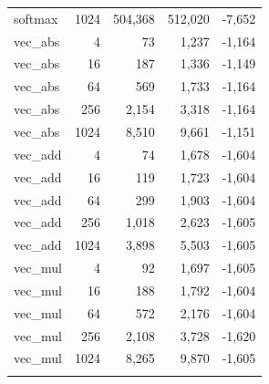 \begin{center}
\begin{longtable}{l r r r r}
softmax & 1024 & 504,368 & 512,020 & -7,652 \\ 
vec_abs & 4 & 73 & 1,237 & -1,164 \\ 
vec_abs & 16 & 187 & 1,336 & -1,149 \\ 
vec_abs & 64 & 569 & 1,733 & -1,164 \\ 
vec_abs & 256 & 2,154 & 3,318 & -1,164 \\ 
vec_abs & 1024 & 8,510 & 9,661 & -1,151 \\ 
vec_add & 4 & 74 & 1,678 & -1,604 \\ 
vec_add & 16 & 119 & 1,723 & -1,604 \\ 
vec_add & 64 & 299 & 1,903 & -1,604 \\ 
vec_add & 256 & 1,018 & 2,623 & -1,605 \\ 
vec_add & 1024 & 3,898 & 5,503 & -1,605 \\ 
vec_mul & 4 & 92 & 1,697 & -1,605 \\ 
vec_mul & 16 & 188 & 1,792 & -1,604 \\ 
vec_mul & 64 & 572 & 2,176 & -1,604 \\ 
vec_mul & 256 & 2,108 & 3,728 & -1,620 \\ 
vec_mul & 1024 & 8,265 & 9,870 & -1,605 \\ 
\hline\n\end{longtable}
\end{center}
